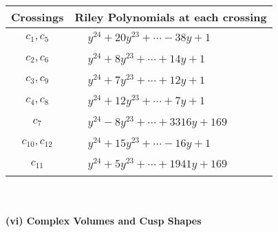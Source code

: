 \documentclass[1p]{elsarticle_modified}
\theoremstyle{definition}
\begin{document}
\begin{tabular}{m{50pt}|m{274pt}}
Crossings & \hspace{64pt}Riley Polynomials at each crossing \\
\hline $$\begin{aligned}c_{1},c_{5}\end{aligned}$$&$\begin{aligned}
&y^{24}+20 y^{23}+\cdots-38 y+1
\end{aligned}$\\
\hline $$\begin{aligned}c_{2},c_{6}\end{aligned}$$&$\begin{aligned}
&y^{24}+8 y^{23}+\cdots+14 y+1
\end{aligned}$\\
\hline $$\begin{aligned}c_{3},c_{9}\end{aligned}$$&$\begin{aligned}
&y^{24}+7 y^{23}+\cdots+12 y+1
\end{aligned}$\\
\hline $$\begin{aligned}c_{4},c_{8}\end{aligned}$$&$\begin{aligned}
&y^{24}+12 y^{23}+\cdots+7 y+1
\end{aligned}$\\
\hline $$\begin{aligned}c_{7}\end{aligned}$$&$\begin{aligned}
&y^{24}-8 y^{23}+\cdots+3316 y+169
\end{aligned}$\\
\hline $$\begin{aligned}c_{10},c_{12}\end{aligned}$$&$\begin{aligned}
&y^{24}+15 y^{23}+\cdots-16 y+1
\end{aligned}$\\
\hline $$\begin{aligned}c_{11}\end{aligned}$$&$\begin{aligned}
&y^{24}+5 y^{23}+\cdots+1941 y+169
\end{aligned}$\\
\hline
\end{tabular}\\~\\
\newpage\flushleft \textbf{(vi) Complex Volumes and Cusp Shapes}
\end{document}

